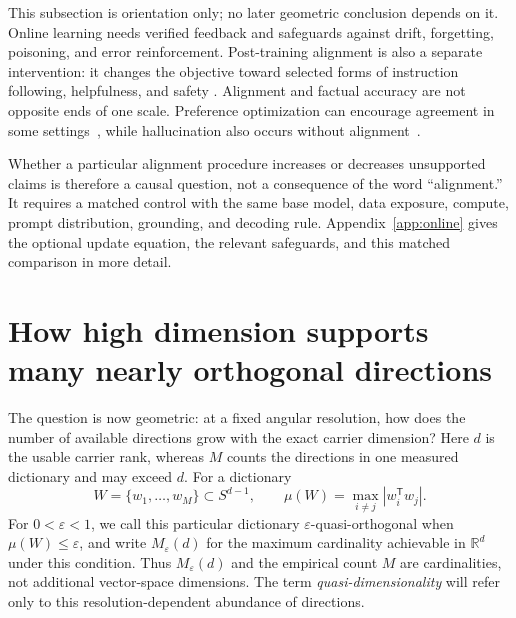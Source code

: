 \documentclass[
  aps,
  reprint,
  superscriptaddress,
  floatfix,
  nofootinbib,
  longbibliography
]{revtex4-2}
\newcommand{\R}{\mathbb{R}}
\newcommand{\Sph}[1]{S^{#1}}
\newcommand{\Msem}{M}
\newcommand{\T}{^{\mathsf{T}}}
\begin{document}
This subsection is orientation only; no later geometric conclusion depends on
it.  Online learning needs verified feedback and safeguards against drift,
forgetting, poisoning, and error reinforcement.  Post-training alignment is
also a separate intervention: it changes the objective toward selected forms
of instruction following, helpfulness, and safety
\cite{ouyang2022instructgpt}.  Alignment and factual accuracy are not opposite
ends of one scale.  Preference optimization can encourage agreement in some
settings~\cite{sharma2023sycophancy}, while hallucination also occurs without
alignment~\cite{Kalai2025Why}.

Whether a particular alignment procedure increases or decreases unsupported
claims is therefore a causal question, not a consequence of the word
``alignment.''  It requires a matched control with the same base model, data
exposure, compute, prompt distribution, grounding, and decoding rule.
Appendix~\ref{app:online} gives the optional update equation, the relevant
safeguards, and this matched comparison in more detail.

\section{How high dimension supports many nearly orthogonal directions}
\label{sec:concentration}

The question is now geometric: at a fixed angular resolution, how does the
number of available directions grow with the exact carrier dimension?  Here
$d$ is the usable carrier rank, whereas $\Msem$ counts the directions in one
measured dictionary and may exceed $d$.  For a dictionary
\begin{equation}
\label{eq:quasiortho}
W=\{w_1,\ldots,w_{\Msem}\}\subset\Sph{d-1},
\qquad
\mu(W)=\max_{i\ne j}|w_i\T w_j|.
\end{equation}
For $0<\varepsilon<1$, we call this particular dictionary
$\varepsilon$-quasi-orthogonal when $\mu(W)\leq\varepsilon$, and write
$M_\varepsilon(d)$ for the maximum cardinality achievable in $\R^d$ under
this condition.  Thus
$M_\varepsilon(d)$ and the empirical count $\Msem$ are cardinalities, not
additional vector-space dimensions.  The term \emph{quasi-dimensionality}
will refer only to this resolution-dependent abundance of directions.
\end{document}
